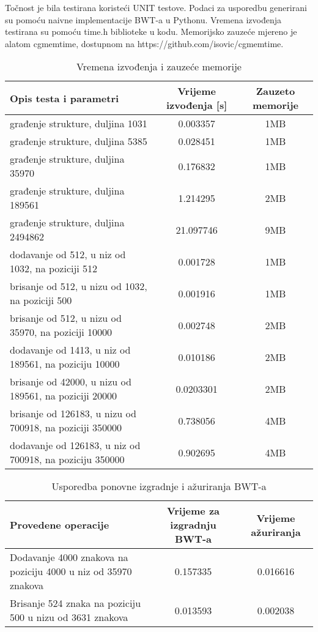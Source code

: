 \documentclass{ferseminar}
\begin{document}
Točnost je bila testirana koristeći UNIT testove. Podaci za usporedbu generirani su pomoću naivne implementacije BWT-a u Pythonu. Vremena izvođenja testirana su pomoću time.h biblioteke u kodu. Memorijsko zauzeće mjereno je alatom cgmemtime, dostupnom na https://github.com/isovic/cgmemtime.
\begin{table}[h]


\begin{tabular}{|m{7cm}|c|c| }
	\hline
	Opis testa i parametri & Vrijeme izvođenja [s] & Zauzeto memorije \\
	\hline
	građenje strukture, duljina 1031 & 0.003357 & 1MB \\
	\hline
	građenje strukture, duljina 5385 & 0.028451 & 1MB \\
	\hline
	građenje strukture, duljina 35970 & 0.176832 & 1MB \\
	\hline
	građenje strukture,  duljina 189561 & 1.214295 & 2MB \\
	\hline
	građenje strukture, duljina 2494862 & 21.097746 & 9MB \\
	\hline
	dodavanje od 512, u niz od 1032, na poziciji 512   & 0.001728 & 1MB \\
	\hline
	brisanje od 512, u nizu od 1032, na poziciji 500   & 0.001916 & 1MB \\
	\hline
	brisanje od 512, u nizu od 35970, na poziciji 10000   & 0.002748 & 2MB \\
	\hline
	dodavanje od 1413, u niz od 189561, na poziciju 10000   & 0.010186 & 2MB \\
	\hline
	brisanje od 42000, u nizu od 189561, na poziciji 20000   & 0.0203301 & 2MB \\
	\hline
	brisanje od 126183, u nizu od 700918, na poziciji 350000   & 0.738056 & 4MB \\
	\hline
	dodavanje od 126183, u niz od 700918, na poziciju 350000   & 0.902695 & 4MB \\
	\hline	
\end{tabular}
\caption{Vremena izvođenja i zauzeće memorije}
\label{tablica:vremena}
\end{table}
\begin{table}[h]
\begin{tabular}{|m{5cm}|c|c|}
	\hline
	Provedene operacije & Vrijeme za izgradnju BWT-a & Vrijeme ažuriranja \\
	\hline
	Dodavanje 4000 znakova na poziciju 4000 u niz od 35970 znakova & 0.157335 & 0.016616 \\
	\hline
	Brisanje 524 znaka na poziciju 500 u nizu od 3631 znakova & 0.013593 & 0.002038 \\
	\hline
\end{tabular}
\caption{Usporedba ponovne izgradnje i ažuriranja BWT-a}
\label{tablica:usporedba}
\end{table}
\end{document}
